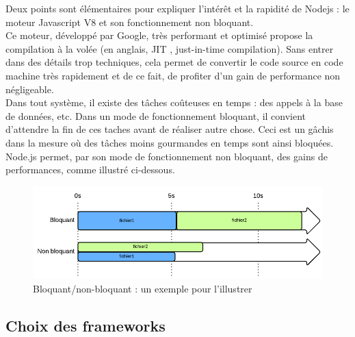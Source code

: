 Deux points sont élémentaires pour expliquer l'intérêt et la rapidité de Nodejs : le moteur Javascript V8 et son fonctionnement non bloquant. \\

Ce moteur, développé par Google, très performant et optimisé propose la compilation à la volée (en anglais, JIT , just-in-time compilation).
Sans entrer dans des détails trop techniques, cela permet de convertir le code source en code machine très rapidement et de ce fait, de profiter d'un gain de performance non négligeable. \\ 

Dans tout système, il existe des tâches coûteuses en temps : des appels à la base de données, etc.
Dans un mode de fonctionnement bloquant, il convient d'attendre la fin de ces taches avant de réaliser autre chose. Ceci est un gâchis dans la mesure où des tâches moins gourmandes en temps sont ainsi bloquées. Node.js permet, par son mode de fonctionnement non bloquant, des gains de performances, comme illustré ci-dessous.

\begin{figure}[H]
    \includegraphics[width=\textwidth,height=\textheight,keepaspectratio]{images/ComparaisonBloquantOuNon.png}
    \centering
    \caption[Bloquant/non-bloquant : un exemple pour l'illustrer]{Bloquant/non-bloquant : un exemple pour l'illustrer~\cite{NodejsIllustrations}}
    \label{pic:BloquantOrNot}
\end{figure}

\pagebreak

\subsection*{Choix des frameworks}

